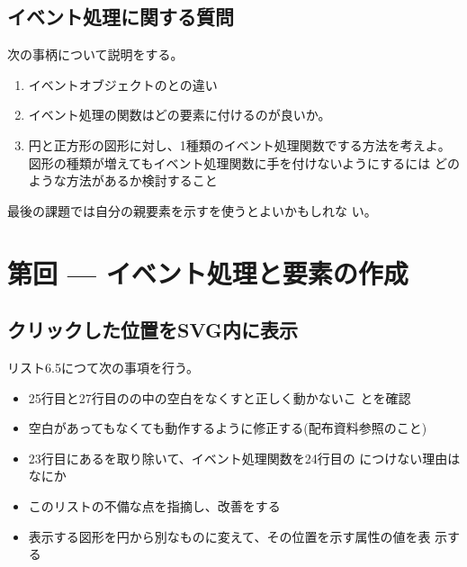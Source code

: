 \documentclass[a4j]{jarticle}
\renewcommand{\Section}[1]{%
\newpage \stepcounter{ReportNo}\section{第\theReportNo 回 --- #1}
}
\begin{document}
\subsection{イベント処理に関する質問}
次の事柄について説明をする。
\begin{enumerate}
 \item イベントオブジェクトのとの違い
 \item イベント処理の関数はどの要素に付けるのが良いか。
 \item 円と正方形の図形に対し、1種類のイベント処理関数でする方法を考えよ。
			 図形の種類が増えてもイベント処理関数に手を付けないようにするには
			 どのような方法があるか検討すること
\end{enumerate}
最後の課題では自分の親要素を示すを使うとよいかもしれな
い。
\newpage
\Section{イベント処理と要素の作成}
\iffalse
\subsection{当面の予定について}
今回と次回の演習でローカルなSVG文書やHTML文書の基本が終了するので、これ
までに学習したことについてまとめの発表を6月7日（火）に行う。
概要は次の通りである。
\begin{itemize}
 \item 全員が7分程度の発表を行う。
 \item 発表順は授業開始直後に抽選で決定する。
 \item 他人の発表についての感想を記したものを授業終了時に提出する。
 \item 発表内容は次の中から選択すること
\begin{itemize}
 \item 今までに学習してきたことのまとめと発展
 \item 今までに作成したものの改良したもの
 \item 最終週に向けた課題の構想
 \item その他、上記に準ずるもの
\end{itemize}
\end{itemize}
なお、最終週7月26日についても演習の総まとめの発表を行う。また、最終発表
に関連したレポートを電子メールで提出する(30ページ以上)。詳細は後日連絡す
る。
\fi
\subsection{クリックした位置をSVG内に表示}
 リスト6.5につて次の事項を行う。
 \begin{itemize}
  \item  25行目と27行目のの中の空白をなくすと正しく動かないこ
         とを確認
  \item 空白があってもなくても動作するように修正する(配布資料参照のこと)
	\item 23行目にあるを取り除いて、イベント処理関数を24行目の
				につけない理由はなにか
	\item このリストの不備な点を指摘し、改善をする
	\item 表示する図形を円から別なものに変えて、その位置を示す属性の値を表
				示する
 \end{itemize}
\end{document}
